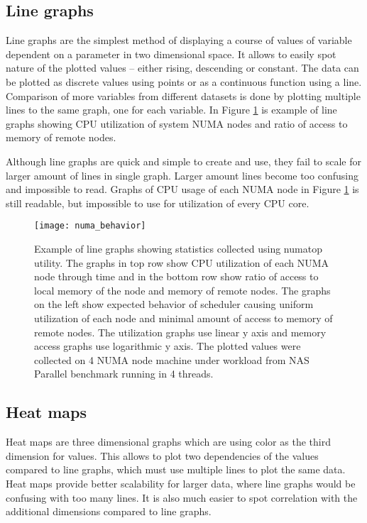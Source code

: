 \subsection{Line graphs}
Line graphs are the simplest method of displaying a course of values of variable
dependent on a parameter in two dimensional space. It allows to easily spot
nature of the plotted values -- either rising, descending or constant. The
data can be plotted as discrete values using points or as a continuous function
using a line. Comparison of more variables from different datasets is done by
plotting multiple lines to the same graph, one for each variable. In Figure
\ref{fig:linegraph} is example of line graphs showing CPU utilization of system
NUMA nodes and ratio of access to memory of remote nodes.

Although line graphs are quick and simple to create and use, they fail to scale
for larger amount of lines in single graph. Larger amount lines become too
confusing and impossible to read. Graphs of CPU usage of each NUMA node in
Figure \ref{fig:linegraph} is still readable, but impossible to use for
utilization of every CPU core.

\begin{figure}
  \centering
  \texttt{[image: numa\_behavior]}
  \caption{Example of line graphs showing statistics collected using numatop
    utility. The graphs in top row show CPU utilization of each NUMA node
    through time and in the bottom row show ratio of access to local memory of
    the node and memory of remote nodes. The graphs on the left show expected
    behavior of scheduler causing uniform utilization of each node and minimal
    amount of access to memory of remote nodes. The utilization graphs use
    linear y axis and memory access graphs use logarithmic y axis. The plotted
    values were collected on 4 NUMA node machine under workload from NAS
    Parallel benchmark running in 4 threads.}
  \label{fig:linegraph}
\end{figure}

\subsection{Heat maps}
Heat maps are three dimensional graphs which are using color as the third
dimension for values. This allows to plot two dependencies of the values
compared to line graphs, which must use multiple lines to plot the same data.
Heat maps provide better scalability for larger data, where line graphs would be
confusing with too many lines. It is also much easier to spot correlation
with the additional dimensions compared to line graphs.

